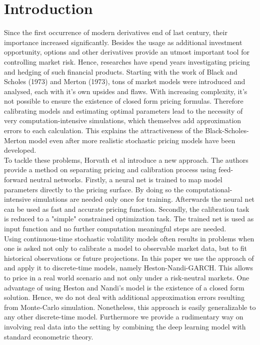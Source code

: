 \documentclass{article}
\begin{document}
\section{Introduction}
Since the first occurrence of modern derivatives end of last century, their importance increased significantly. Besides the usage as additional investment opportunity, options and other derivatives provide an utmost important tool for controlling market risk. Hence, researches have spend years investigating pricing and hedging of such financial products. Starting with the work of Black and Scholes (1973) and Merton (1973), tons of market models were introduced and analysed, each with it's own upsides and flaws. With increasing complexity, it's not possible to ensure the existence of closed form pricing formulas. Therefore calibrating models and estimating optimal parameters lead to the necessity of very computation-intensive simulations, which themselves add approximation errors to each calculation. This explains the attractiveness of the Black-Scholes-Merton model even after more realistic stochastic pricing models have been developed.  \\ 
To tackle these problems, Horvath et al  \cite{Blanka} introduce a new approach. The authors provide a method on separating pricing and calibration process using feed-forward neutral networks. Firstly, a neural net is trained to map model parameters directly to the pricing surface. By doing so the computational-intensive simulations are needed  only once for training. Afterwards the neural net  can be used as fast and accurate pricing function. Secondly, the calibration task is reduced to a "simple" constrained optimization task. The trained net is used as input function and no further computation meaningful steps are needed. \\
Using continuous-time stochastic volatility models often results in problems when one is asked not only to calibrate a model to observable market data, but to fit historical observations or future projections. In this paper we use the approach of \cite{Blanka} and apply it to discrete-time models, namely Heston-Nandi-GARCH. This allows to price in a real world scenario and not only under a risk-neutral markets. One advantage of using Heston and Nandi's model is the existence of a closed form solution. Hence, we do not deal with additional approximation errors resulting from Monte-Carlo simulation. Nonetheless, this approach is easily generalizable to any other discrete-time model. Furthermore we provide a rudimentary way on involving real data into the setting by combining the deep learning model with standard econometric theory.
\end{document}
